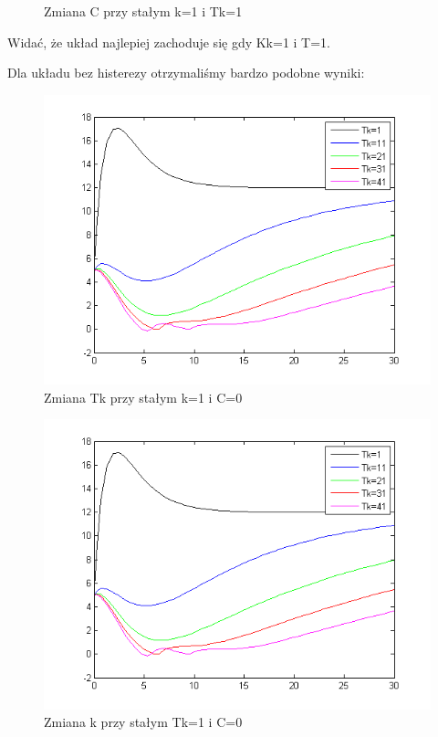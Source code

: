 \documentclass[a4paper,10pt]{article}
\begin{document}
\begin{enumerate}
\begin{figure}[!h]
	\caption{Zmiana C przy stałym k=1 i Tk=1}
    \label{fig:Rysunek}
\end{figure}

Widać, że układ najlepiej zachoduje się gdy Kk=1 i T=1.

Dla układu bez histerezy otrzymaliśmy bardzo podobne wyniki:
\begin{figure}[!h]
    \centering
	\includegraphics[width=120mm]{CW3-korekcja-dwupolozeniowyBH-e_Tk.png}
	\caption{Zmiana Tk przy stałym k=1 i C=0}
    \label{fig:Rysunek}
\end{figure}

\begin{figure}[!h]
    \centering
	\includegraphics[width=120mm]{CW3-korekcja-dwupolozeniowyBH-e_k.png}
	\caption{Zmiana k przy stałym Tk=1 i C=0}
    \label{fig:Rysunek}
\end{figure}


\end{enumerate}
\end{document}
